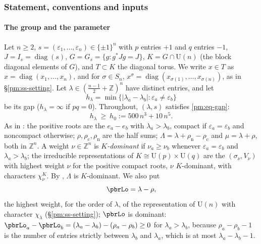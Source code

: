 \documentclass[10pt]{amsart}
\theoremstyle{definition}
\theoremstyle{remark}
\newcommand{\Z}{\mathbb Z}
\providecommand{\auU}{\mathrm U}
\begin{document}
\subsubsection{Statement, conventions and inputs}\label{pbr:ss-statement}

\paragraph*{The group and the parameter}
Let $n\ge2$, $s=(\varepsilon_1,\dots,\varepsilon_n)\in\{\pm1\}^n$ with $p$ entries $+1$ and $q$
entries $-1$, $J=I_s=\operatorname{diag}(s)$, $G=G_s=\{g:g^*Jg=J\}$, $K=G\cap\auU(n)$ (the block
diagonal elements of $G$), and $T\subset K$ the diagonal torus. We write $x\in T$ as
$x=\operatorname{diag}(x_1,\dots,x_n)$, and for $\sigma\in S_n$, $x^\sigma=\operatorname{diag}(
x_{\sigma(1)},\dots,x_{\sigma(n)})$, as in \S\ref{pm:ss-setting}. Let $\lambda\in(\frac{n-1}2+\Z)^n$
have distinct entries, and let
\[
h_\lambda=\min\{|\lambda_a-\lambda_b|:\varepsilon_a\ne\varepsilon_b\}
\]
be its gap ($h_\lambda=\infty$ if $pq=0$). Throughout, $(\lambda,s)$ satisfies \eqref{pm:eq-gap}:
\begin{equation}\label{pbr:eq-gap}
h_\lambda\ \ge\ h_0:=500\,n^3+10\,n^5 .
\end{equation}
As in {\cite[\S3.2.1]{P49}}: the positive roots are the $e_a-e_b$ with $\lambda_a>\lambda_b$, compact
if $\varepsilon_a=\varepsilon_b$ and noncompact otherwise; $\rho,\rho_{\mathrm c},\rho_{\mathrm n}$
are the half sums; $\Lambda=\lambda+\rho_{\mathrm n}-\rho_{\mathrm c}$ and $\mu=\lambda+\rho$, both in
$\Z^n$. A weight $\nu\in\Z^n$ is \emph{$K$-dominant} if $\nu_a\ge\nu_b$ whenever $\varepsilon_a=
\varepsilon_b$ and $\lambda_a>\lambda_b$; the irreducible representations of $K\cong\auU(p)\times
\auU(q)$ are the $(\sigma_\nu,V_\nu)$ with highest weight $\nu$ for the positive compact roots,
$\nu$ $K$-dominant, with characters $\chi^K_\nu$. By {\cite[Lemma~3.18(c)]{P49}}, $\Lambda$ is
$K$-dominant. We also put
\[
\pbrLo=\lambda-\rho ,
\]
the highest weight, for the order of $\lambda$, of the representation of $\auU(n)$ with character
$\chi_\lambda$ (\S\ref{pm:ss-setting}); $\pbrLo$ is dominant: $\pbrLo_a-\pbrLo_b=(\lambda_a-
\lambda_b)-(\rho_a-\rho_b)\ge0$ for $\lambda_a>\lambda_b$, because $\rho_a-\rho_b-1$ is the number of
entries strictly between $\lambda_b$ and $\lambda_a$, which is at most $\lambda_a-\lambda_b-1$.
\end{document}
